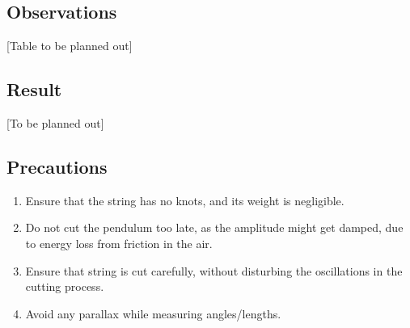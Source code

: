 \subsection{Observations}
[Table to be planned out]
\subsection{Result}
[To be planned out]
\subsection{Precautions}
\begin{enumerate}
\item Ensure that the string has no knots, and its weight is negligible.
\item Do not cut the pendulum too late, as the amplitude might get damped, due to energy loss from friction in the air.
\item Ensure that string is cut carefully, without disturbing the oscillations in the cutting process.
\item Avoid any parallax while measuring angles/lengths.
\end{enumerate}




  

                                                                           